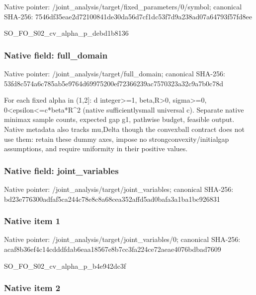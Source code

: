 \documentclass[10pt,a4paper]{article}
\begin{document}
Native pointer: /joint\_analysis/target/f\allowbreak{}ixed\_parameters/0/symbol; canonical SHA-256: 7546df35eae2d72100841de3\allowbreak{}0da56d7cf1dc53f7d9a238ad\allowbreak{}07a64793f57fd8ee


SO\_FO\_S02\_cv\_alpha\_p\_debd1b8136


\subsubsection{Native field: full\_domain}


Native pointer: /joint\_analysis/target/full\_domain; canonical SHA-256: 53fd8c574a6c785ab5e9764d\allowbreak{}69975200ef72366239ac7570\allowbreak{}323a32c9a7b0c78d


For each fixed alpha in (1,2]: d integer>=1, beta,R>0, sigma>=0, 0<epsilon<=c*beta*R\textasciicircum{}2 (native sufficientlysmall universal c). Separate native minimax sample counts, expected gap g1, pathwise budget, feasible output. Native metadata also tracks mu,Delta though the convexball contract does not use them: retain these dummy axes, impose no strongconvexity/initialgap assumptions, and require uniformity in their positive values.


\subsubsection{Native field: joint\_variables}


Native pointer: /joint\_analysis/target/joint\_variables; canonical SHA-256: bd23e776300adfaf5ca244c7\allowbreak{}8e8c8a68cea352affd5ad0ba\allowbreak{}fa3a1ba1bc926831



\subsubsection{Native item 1}


Native pointer: /joint\_analysis/target/j\allowbreak{}oint\_variables/0; canonical SHA-256: acaf8b36ef4c14cdddfdab6e\allowbreak{}aa18567e8b7cc3fa224ce72a\allowbreak{}eae4076bdbad7609


SO\_FO\_S02\_cv\_alpha\_p\_b4e942dc3f


\subsubsection{Native item 2}
\end{document}
